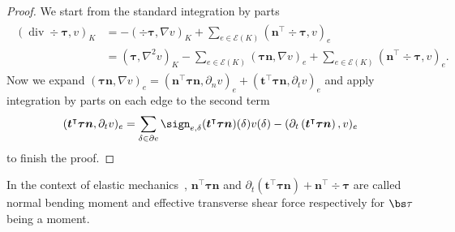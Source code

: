 \begin{proof}
We start from the standard integration by parts
\begin{align*}
\begin{aligned}
(\operatorname{div} \div \boldsymbol  \tau, v)_{K} &=-(\div  \boldsymbol   \tau, \nabla v)_{K}+\sum_{e \in \mathcal E(K)}(\boldsymbol  n^{\intercal} \div  \boldsymbol   \tau, v)_e \\
&=\left(\boldsymbol  \tau, \nabla^{2} v\right)_{K}-\sum_{e \in \mathcal E(K)} (\boldsymbol  \tau \boldsymbol  n, \nabla v)_e+\sum_{e \in \mathcal E(K)}(\boldsymbol  n^{\intercal} \div  \boldsymbol   \tau, v)_e.
\end{aligned}
\end{align*}
Now we expand $(\boldsymbol  \tau \boldsymbol  n, \nabla v)_e=(\boldsymbol  n^{\intercal} \boldsymbol  \tau \boldsymbol  n,  \partial_{n} v)_e+ (\boldsymbol  t^{\intercal} \boldsymbol  \tau \boldsymbol  n, \partial_{t} v)_e$ and apply integration by parts on each edge to the second term
$$
(\boldsymbol  t^{\intercal} \boldsymbol  \tau \boldsymbol  n, \partial_{t} v)_e=\sum_{\delta \in \partial e} \sign_{e,\delta}(\boldsymbol  t^{\intercal}\boldsymbol \tau\boldsymbol  n)(\delta)v(\delta)-(\partial_ t\left( \boldsymbol  t^{\intercal} \boldsymbol  \tau \boldsymbol  n\right), v)_e
$$
to finish the proof.
\end{proof}

In the context of elastic mechanics~\cite{FengShi1996}, $\boldsymbol  n^{\intercal}\boldsymbol \tau\boldsymbol  n$ and $\partial_{t}(\boldsymbol  t^{\intercal}\boldsymbol \tau\boldsymbol  n)+\boldsymbol  n^{\intercal} \div\boldsymbol \tau$ are called
normal bending moment and effective transverse shear force respectively for $\bs\tau$ being a moment.

